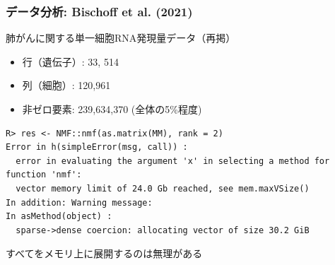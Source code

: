 \documentclass[dvipdfmx, dvipsnames]{beamer}
\begin{document}
\begin{frame}[fragile=singleslide]
\frametitle{データ分析: Bischoff et al. (2021) }

肺がんに関する単一細胞RNA発現量データ（再掲）
\begin{itemize}
\item 行（遺伝子）: 33, 514
\item 列（細胞）: 120,961
\item 非ゼロ要素: 239,634,370 (全体の5\%程度)
\end{itemize}

{\scriptsize
\begin{verbatim}
R> res <- NMF::nmf(as.matrix(MM), rank = 2)
Error in h(simpleError(msg, call)) :  
  error in evaluating the argument 'x' in selecting a method for function 'nmf':
  vector memory limit of 24.0 Gb reached, see mem.maxVSize()
In addition: Warning message:
In asMethod(object) :
  sparse->dense coercion: allocating vector of size 30.2 GiB
\end{verbatim}
}
すべてをメモリ上に展開するのは無理がある
\end{frame}
\end{document}
